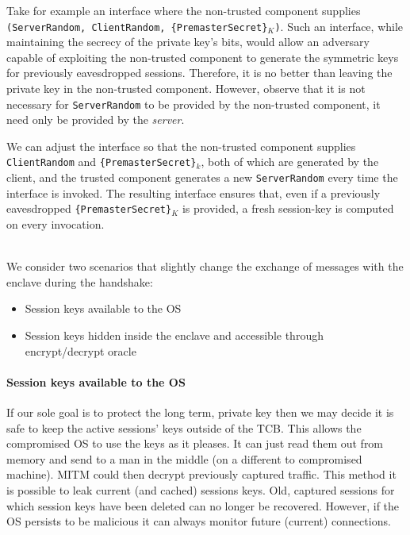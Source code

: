 \documentclass[../main.tex]{subfiles}
\begin{document}
Take for example an interface where the non-trusted component supplies
\texttt{(ServerRandom, ClientRandom, \{PremasterSecret\}$_K$)}. Such
an interface, while maintaining the secrecy of the private key's bits,
would allow an adversary capable of exploiting the non-trusted
component to generate the symmetric keys for previously eavesdropped
sessions. Therefore, it is no better than leaving the private key in
the non-trusted component.  However, observe that it is not necessary
for \texttt{ServerRandom} to be provided by the non-trusted component,
it need only be provided by the \textit{server}.


We can adjust the interface so that the non-trusted component supplies
\texttt{ClientRandom} and \texttt{\{PremasterSecret\}$_k$}, both of
which are generated by the client, and the trusted component generates
a new \texttt{ServerRandom} every time the interface is invoked. The
resulting interface ensures that, even if a previously eavesdropped
\texttt{\{PremasterSecret\}$_K$} is provided, a fresh session-key is
computed on every invocation.




\noindent
\\We consider two scenarios that slightly change the exchange of
messages with the enclave during the handshake:
\begin{itemize}
  \item Session keys available to the OS
  \item Session keys hidden inside the enclave and accessible through
    encrypt/decrypt oracle
\end{itemize}



\paragraph{Session keys available to the OS}

If our sole goal is to protect the long term, private key then we may
decide it is safe to keep the active sessions' keys outside of the
TCB. This allows the compromised OS to use the keys as it pleases. It
can just read them out from memory and send to a man in the middle (on
a different to compromised machine). MITM could then decrypt
previously captured traffic. This method it is possible to leak
current (and cached) sessions keys. Old, captured sessions for which
session keys have been deleted can no longer be recovered. However, if
the OS persists to be malicious it can always monitor future (current)
connections.\\
\end{document}
